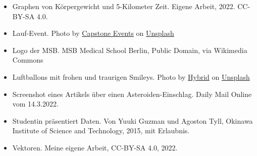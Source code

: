 \documentclass{beamer}
\begin{document}
\begin{frame}
\begin{tiny}
\begin{itemize}
\item
Graphen von Körpergewicht und 5-Kilometer Zeit. Eigene Arbeit, 2022. CC-BY-SA 4.0.
  \item
Lauf-Event. Photo by \href{https://unsplash.com/@capstoneeventgroup?utm_source=unsplash&utm_medium=referral&utm_content=creditCopyText}{Capstone Events} on \href{https://unsplash.com/s/photos/marathon?utm_source=unsplash&utm_medium=referral&utm_content=creditCopyText}{Unsplash}
\item
Logo der MSB. MSB Medical School Berlin, Public Domain, via Wikimedia Commons

\item
Luftballons mit frohen und traurigen Smileys. Photo by \href{https://unsplash.com/@artbyhybrid?utm_source=unsplash&utm_medium=referral&utm_content=creditCopyText}{Hybrid} on \href{https://unsplash.com/s/photos/feedback?utm_source=unsplash&utm_medium=referral&utm_content=creditCopyText}{Unsplash}


\item
Screenshot eines Artikels über einen Asteroiden-Einschlag. Daily Mail Online vom 14.3.2022.
\item
Studentin präsentiert Daten. Von Yuuki Guzman und Agoston Tyll, Okinawa Institute of Science and Technology, 2015, mit Erlaubnis. 
\item
Vektoren. Meine eigene Arbeit, CC-BY-SA 4.0, 2022.
\end{itemize}

\end{tiny}
\end{frame}
\end{document}

